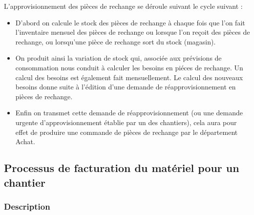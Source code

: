 						L'approvisionnement des pièces de rechange se déroule suivant le cycle suivant :
						\begin{itemize}
						    \item D'abord on calcule le stock des pièces de rechange à chaque fois que l'on fait l'inventaire mensuel des pièces de rechange ou lorsque l'on reçoit des pièces de rechange, ou lorsqu'une pièce de rechange sort du stock (magasin).
						    \item On produit ainsi la variation de stock qui, associée aux prévisions de consommation nous conduit à calculer les besoins en piéces de rechange. Un calcul des besoins est également fait mensuellement. Le calcul des nouveaux besoins donne suite à l'édition d'une demande de réapprovisionnement en pièces de rechange.
						    \item Enfin on transmet cette demande de réapprovisionnement (ou une demande urgente d'approvisionnement
établie par un des chantiers), cela aura pour effet de produire une commande de pièces de rechange par le département Achat.
						\end{itemize}
						
				
				
				
		\subsection{Processus de facturation du matériel pour un chantier}
				\subsubsection{Description}
				
